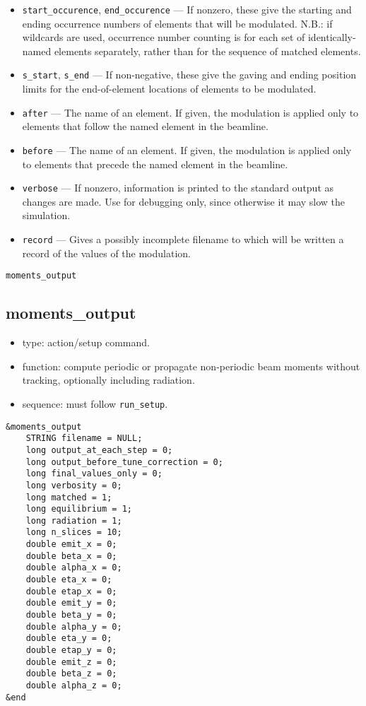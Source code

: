\documentclass[11pt]{article}
\begin{document}
\begin{itemize}
\item \verb|start_occurence|, \verb|end_occurence| --- If nonzero, these give the starting and
 ending occurrence numbers of elements that will be modulated. N.B.: if wildcards are used, occurrence
 number counting is for each set of identically-named elements separately, rather than for the sequence
 of matched elements.
\item \verb|s_start|, \verb|s_end| --- If non-negative, these give the gaving and ending position
 limits for the end-of-element locations of elements to be modulated.
\item \verb|after| --- The name of an element.  If given, the modulation is applied only to elements
 that follow the named element in the beamline.  
\item \verb|before| --- The name of an element.  If given, the modulation is applied only to elements
 that precede the named element in the beamline. 
\item \verb|verbose| --- If nonzero, information is printed to the standard output as changes are
        made.  Use for debugging only, since otherwise it may slow the simulation.
\item \verb|record| --- Gives a possibly incomplete filename to which will be written a record of the values of
  the modulation.
\end{itemize}

\newpage
\begin{center}{\Large\verb|moments_output|}\end{center}
\subsection{moments\_output \label{subsec:momentsoutput}}

\begin{itemize}
\item type: action/setup command.
\item function: compute periodic or propagate non-periodic beam moments without tracking, optionally including radiation.
\item sequence: must follow \verb|run_setup|.
\end{itemize}

\begin{verbatim}
&moments_output
    STRING filename = NULL;
    long output_at_each_step = 0;
    long output_before_tune_correction = 0;
    long final_values_only = 0;
    long verbosity = 0;
    long matched = 1;
    long equilibrium = 1;
    long radiation = 1;
    long n_slices = 10;
    double emit_x = 0;
    double beta_x = 0;
    double alpha_x = 0;
    double eta_x = 0;
    double etap_x = 0;
    double emit_y = 0;
    double beta_y = 0;
    double alpha_y = 0;
    double eta_y = 0;
    double etap_y = 0;
    double emit_z = 0;
    double beta_z = 0;
    double alpha_z = 0;
&end
\end{verbatim}
\end{document}
